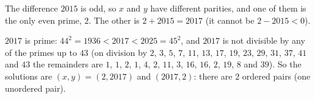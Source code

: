 The difference $2015$ is odd, so $x$ and $y$ have different parities, and one of them is the only even prime, $2$. The other is $2+2015=2017$ (it cannot be $2-2015<0$).

$2017$ is prime: $44^2=1936<2017<2025=45^2$, and $2017$ is not divisible by any of the primes up to $43$ (on division by $2$, $3$, $5$, $7$, $11$, $13$, $17$, $19$, $23$, $29$, $31$, $37$, $41$ and $43$ the remainders are $1$, $1$, $2$, $1$, $4$, $2$, $11$, $3$, $16$, $16$, $2$, $19$, $8$ and $39$). So the solutions are $(x,y)=(2,2017)$ and $(2017,2)$: there are $\boxed{2}$ ordered pairs (one unordered pair).
